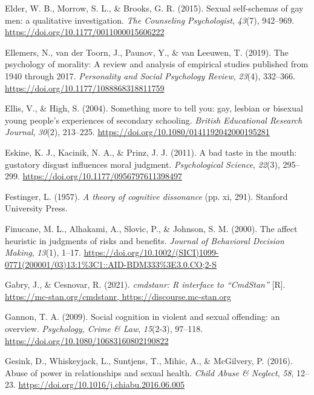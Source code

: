 \documentclass[
  donotrepeattitle,doc, 12pt, a4paper,floatsintext]{apa7}
\newlength{\cslhangindent}
\newlength{\cslentryspacingunit} %
\newenvironment{CSLReferences}[2] %
 {%
  \setlength{\parindent}{0pt}
  \ifodd #1
  \let\oldpar\par
  \def\par{\hangindent=\cslhangindent\oldpar}
  \fi
  \setlength{\parskip}{#2\cslentryspacingunit}
 }%
 {}
\begin{document}
\begin{CSLReferences}{1}{0}
\leavevmode{}%
Elder, W. B., Morrow, S. L., \& Brooks, G. R. (2015). Sexual self-schemas of gay men: a qualitative investigation. \emph{The Counseling Psychologist}, \emph{43}(7), 942--969. \url{https://doi.org/10.1177/0011000015606222}

\leavevmode{}%
Ellemers, N., van der Toorn, J., Paunov, Y., \& van Leeuwen, T. (2019). The psychology of morality: A review and analysis of empirical studies published from 1940 through 2017. \emph{Personality and Social Psychology Review}, \emph{23}(4), 332--366. \url{https://doi.org/10.1177/1088868318811759}

\leavevmode{}%
Ellis, V., \& High, S. (2004). Something more to tell you: gay, lesbian or bisexual young people's experiences of secondary schooling. \emph{British Educational Research Journal}, \emph{30}(2), 213--225. \url{https://doi.org/10.1080/0141192042000195281}

\leavevmode{}%
Eskine, K. J., Kacinik, N. A., \& Prinz, J. J. (2011). A bad taste in the mouth: gustatory disgust influences moral judgment. \emph{Psychological Science}, \emph{22}(3), 295--299. \url{https://doi.org/10.1177/0956797611398497}

\leavevmode{}%
Festinger, L. (1957). \emph{A theory of cognitive dissonance} (pp. xi, 291). Stanford University Press.

\leavevmode{}%
Finucane, M. L., Alhakami, A., Slovic, P., \& Johnson, S. M. (2000). The affect heuristic in judgments of risks and benefits. \emph{Journal of Behavioral Decision Making}, \emph{13}(1), 1--17. \url{https://doi.org/10.1002/(SICI)1099-0771(200001/03)13:1\%3C1::AID-BDM333\%3E3.0.CO;2-S}

\leavevmode{}%
Gabry, J., \& Cesnovar, R. (2021). \emph{cmdstanr: R interface to {``CmdStan''}} {[}R{]}. \href{https://mc-stan.org/cmdstanr,\%20https://discourse.mc-stan.org}{https://mc-stan.org/cmdstanr, https://discourse.mc-stan.org}

\leavevmode{}%
Gannon, T. A. (2009). Social cognition in violent and sexual offending: an overview. \emph{Psychology, Crime \& Law}, \emph{15}(2-3), 97--118. \url{https://doi.org/10.1080/10683160802190822}

\leavevmode{}%
Gesink, D., Whiskeyjack, L., Suntjens, T., Mihic, A., \& McGilvery, P. (2016). Abuse of power in relationships and sexual health. \emph{Child Abuse \& Neglect}, \emph{58}, 12--23. \url{https://doi.org/10.1016/j.chiabu.2016.06.005}


\end{CSLReferences}
\end{document}
